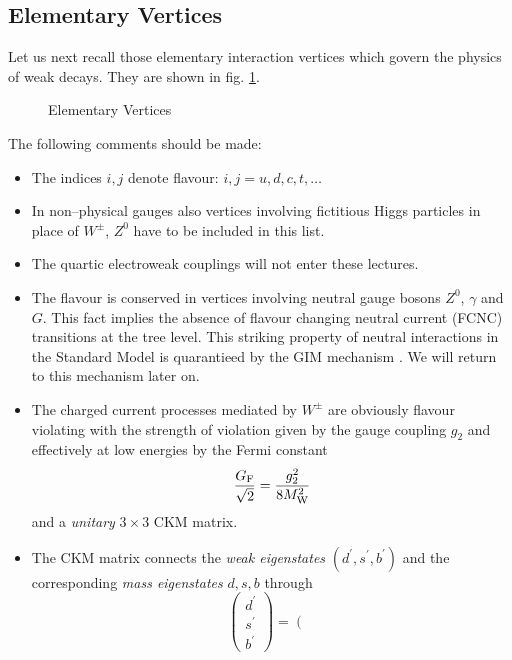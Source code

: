\documentclass[12pt,rotate]{article}
\newcommand{\mw}{M_{\rm W}}
\begin{document}
\subsection{Elementary Vertices }
Let us next recall those elementary interaction vertices which govern
the physics of weak decays. They are shown in fig. \ref{fig:1}.
\begin{figure}[hbt]
\vspace{0.10in}
\centerline{
\epsfysize=3in
}
\vspace{0.08in}
\caption[]{
Elementary Vertices
\label{fig:1}}
\end{figure}
The following comments should be made:
\begin{itemize}
\item
The indices $i,j$ denote flavour: $i,j = u,d,c,t,\ldots$
\item
In non--physical gauges also vertices involving fictitious
Higgs particles in place of $W^{\pm}$, $Z^0$ have to be included in
this list.
\item
The quartic
electroweak couplings will not enter these lectures.
\item
The flavour is conserved in vertices involving neutral gauge bosons
$Z^0$, $\gamma$ and $G$. This fact implies the absence of flavour
changing neutral current (FCNC) transitions at the tree level. 
This striking property of neutral interactions in the Standard
Model is quarantieed by the {\rm GIM} mechanism \cite{GIM1}. 
We will return
to this mechanism later on.
\item
The charged current processes mediated by $W^{\pm}$ are
obviously flavour violating with the strength of violation given by
the gauge coupling $g_2$  and effectively at low energies 
by the Fermi constant 
\begin{equation}\label{2.100}
\frac{G_{\rm F}}{\sqrt{2}}=\frac{g^2_2}{8 \mw^2}
\end{equation}
and a {\it unitary} $3\times3$
{\rm CKM} matrix. 
\item
The {\rm CKM} matrix \cite{CAB,KM,GIM1} connects the {\it weak
eigenstates} $(d^\prime,s^\prime,b^\prime)$ and the corresponding {\it mass 
eigenstates} $d,s,b$ through
\begin{equation}\label{2.67}
\left(\begin{array}{c}
d^\prime \\ s^\prime \\ b^\prime
\end{array}\right)=
\left(\begin{array}{ccc}

\end{array}
\end{equation}
\end{itemize}
\end{document}
